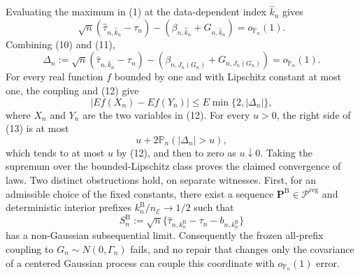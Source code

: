Evaluating the maximum in (1) at the data-dependent index \(\widehat k_n\) gives
\[
 \sqrt n(\widehat\tau_{n,\widehat k_n}-\tau_n)
 -(\beta_{n,\widehat k_n}+G_{n,\widehat k_n})
 =o_{\mathbb P_n}(1). \tag{11}
\]
Combining (10) and (11),
\[
 \Delta_n:=
 \sqrt n(\widehat\tau_{n,\widehat k_n}-\tau_n)
 -(\beta_{n,J_n(G_n)}+G_{n,J_n(G_n)})
 =o_{\mathbb P_n}(1). \tag{12}
\]
For every real function \(f\) bounded by one and with Lipschitz constant at most one, the coupling and (12) give
\[
 \left|E f(X_n)-E f(Y_n)\right|
 \leq E\min\{2,|\Delta_n|\}, \tag{13}
\]
where \(X_n\) and \(Y_n\) are the two variables in (12).  For every \(u>0\), the right side of (13) is at most
\[
 u+2\mathbb P_n(|\Delta_n|>u),
\]
which tends to at most \(u\) by (12), and then to zero as \(u\downarrow0\).  Taking the supremum over the bounded-Lipschitz class proves the claimed convergence of laws.
Two distinct obstructions hold, on separate witnesses.  First, for an admissible choice of the fixed constants, there exist a sequence \(\mathbf P^{\mathrm B}\in\mathcal P^{\mathrm{reg}}\) and deterministic interior prefixes \(k_n^{\mathrm B}/n_{\mathcal E}\to1/2\) such that
\[
 S_n^{\mathrm B}:=
 \sqrt n\{\widehat\tau_{n,k_n^{\mathrm B}}-\tau_n-b_{n,k_n^{\mathrm B}}\}
\]
has a non-Gaussian subsequential limit.  Consequently the frozen all-prefix coupling to \(G_n\sim N(0,\Gamma_n)\) fails, and no repair that changes only the covariance of a centered Gaussian process can couple this coordinate with \(o_{\mathbb P_n}(1)\) error.

